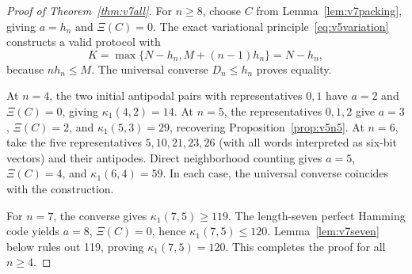 \documentclass[11pt,a4paper]{article}
\begin{document}
\begin{proof}[Proof of Theorem~\ref{thm:v7all}]
For $n\ge8$, choose $C$ from Lemma~\ref{lem:v7packing}, giving $a=h_n$ and $\Xi(C)=0$. The exact variational principle~\eqref{eq:v5variation} constructs a valid protocol with
\[
 K=\max\{N-h_n,M+(n-1)h_n\}=N-h_n,
\]
because $nh_n\le M$. The universal converse $D_n\le h_n$ proves equality.

At $n=4$, the two initial antipodal pairs with representatives $0,1$ have $a=2$ and $\Xi(C)=0$, giving $\kappa_1(4,2)=14$. At $n=5$, the representatives $0,1,2$ give $a=3$, $\Xi(C)=2$, and $\kappa_1(5,3)=29$, recovering Proposition~\ref{prop:v5n5}. At $n=6$, take the five representatives $5,10,21,23,26$ (with all words interpreted as six-bit vectors) and their antipodes. Direct neighborhood counting gives $a=5$, $\Xi(C)=4$, and $\kappa_1(6,4)=59$. In each case, the universal converse coincides with the construction.

For $n=7$, the converse gives $\kappa_1(7,5)\ge119$. The length-seven perfect Hamming code yields $a=8$, $\Xi(C)=0$, hence $\kappa_1(7,5)\le120$. Lemma~\ref{lem:v7seven} below rules out 119, proving $\kappa_1(7,5)=120$. This completes the proof for all $n\ge4$.
\end{proof}
\end{document}
